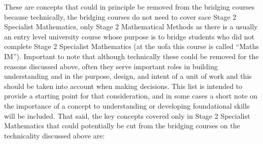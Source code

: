 \documentclass[twoside,12pt,a4paper]{report}
\begin{document}
These are concepts that could in principle be removed from the bridging courses because technically, the bridging courses do not need to cover \gls{sace} Stage 2 Specialist Mathematics, only Stage 2 Mathematical Methods as there is a usually an entry level university course whose purpose is to bridge students who did not complete Stage 2 Specialist Mathematics (at the \gls{uofa} this course is called ``Maths IM''). Important to note that although technically these could be removed for the reasons discussed above, often they serve important roles in building understanding and in the purpose, design, and intent of a unit of work and this should be taken into account when making decisions. This list is intended to provide a starting point for that consideration, and in some cases a short note on the importance of a concept to understanding or developing foundational skills will be included. That said, the key concepts covered only in Stage 2 Specialist Mathematics that could potentially be cut from the bridging courses on the technicality discussed above are:
\end{document}
